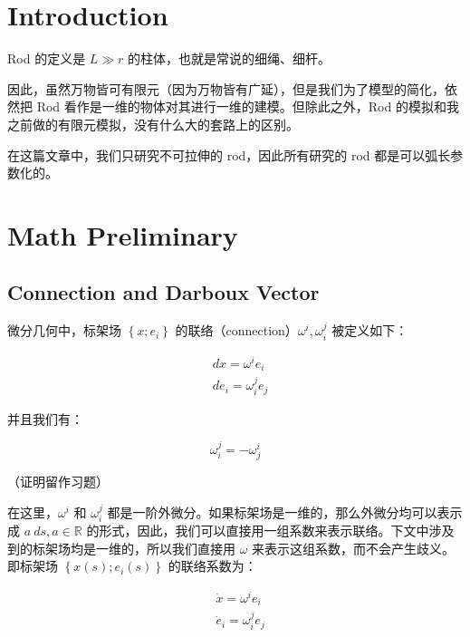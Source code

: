 \documentclass{notes}
\begin{document}
\section{Introduction}

Rod 的定义是 $L \gg r$ 的柱体，也就是常说的细绳、细杆。

因此，虽然万物皆可有限元（因为万物皆有广延），但是我们为了模型的简化，依然把 Rod 看作是一维的物体对其进行一维的建模。但除此之外，Rod 的模拟和我之前做的有限元模拟，没有什么大的套路上的区别。

在这篇文章中，我们只研究不可拉伸的 rod，因此所有研究的 rod 都是可以弧长参数化的。

\section{Math Preliminary}

\subsection{Connection and Darboux Vector}

微分几何中，标架场 $\left\lbrace x; e_i \right\rbrace$ 的联络（connection）$\omega^i, \omega^j_i$ 被定义如下：

\begin{equation}
	\begin{aligned}
		&dx = \omega^i e_i \\
		&de_i = \omega_i^j e_j
	\end{aligned}
\end{equation}

并且我们有：

\begin{equation}
	\omega_i^j = - \omega_j^i
\end{equation}

（证明留作习题）

在这里，$\omega^i$ 和 $\omega^j_i$ 都是一阶外微分。如果标架场是一维的，那么外微分均可以表示成 $a\ ds, a \in \mathbb{R}$ 的形式，因此，我们可以直接用一组系数来表示联络。下文中涉及到的标架场均是一维的，所以我们直接用 $\omega$ 来表示这组系数，而不会产生歧义。即标架场 $\left\lbrace x(s); e_i(s) \right\rbrace$ 的联络系数为：

\begin{equation}
	\begin{aligned}
		&\dot{x} = \omega^i e_i \\
		&\dot{e}_i = \omega_i^j e_j
	\end{aligned}
\end{equation}
\end{document}
